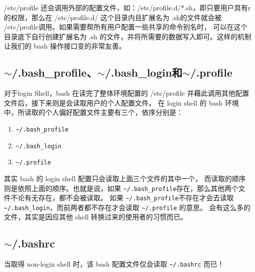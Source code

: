 /etc/profile 还会调用外部的配置文件，如：/etc/profile.d/*.sh，即只要用户具有r的权限，那么在 /etc/profile.d/ 这个目录内且扩展名为 .sh的文件就会被 /etc/profile调用。如果需要帮所有用户配置一些共享的命令别名时， 可以在这个目录底下自行创建扩展名为 .sh 的文件，并将所需要的数据写入即可。这样的机制让我们的 bash 操作接口变的非常友善。


\subsection{$\sim$/.bash\_profile、$\sim$/.bash\_login和$\sim$/.profile}
对于login Shell，bash 在读完了整体环境配置的 /etc/profile 并藉此调用其他配置文件后，接下来则是会读取用户的个人配置文件。 在 login shell 的 bash 环境中，所读取的个人偏好配置文件主要有三个，依序分别是：
\begin{enumerate}
\item \verb|~/.bash_profile|
\item \verb|~/.bash_login|
\item \verb|~/.profile|
\end{enumerate}

其实 bash 的 login shell 配置只会读取上面三个文件的其中一个， 而读取的顺序则是依照上面的顺序。也就是说，如果 \verb|~/.bash_profile|存在，那么其他两个文件不论有无存在，都不会被读取。 如果 \verb|~/.bash_profile|不存在才会去读取 \verb|~/.bash_login|，而前两者都不存在才会读取 \verb|~/.profile| 的意思。 会有这么多的文件，其实是因应其他 shell 转换过来的使用者的习惯而已。


\subsection{$\sim$/.bashrc}
当取得 non-login shell 时，该 bash 配置文件仅会读取 \verb|~/.bashrc| 而已！


